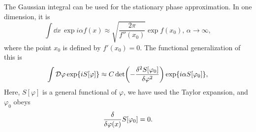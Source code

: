 The Gaussian integral can be used for the stationary phase approximation.
In one dimension, it is
\begin{equation}
    \int \dd x \, \exp{i \alpha f(x)} 
    \approx \sqrt{\frac{2 \pi }{f''(x_0)}}\exp{ f(x_0)}, 
    \, \alpha\rightarrow \infty,
\end{equation}
where the point $x_0$ is defined by $ f'(x_0) = 0$. 
The functional generalization of this is
\begin{equation}
    \int \mathcal{D} \varphi \exp{i S[\varphi]}
    \approx 
    C \det(- \frac{\delta^2 S[\varphi_0]}{\delta \varphi^2})
    \exp{i \alpha S[\varphi_0]  },
\end{equation}
Here, $S[\varphi]$ is a general functional of $\varphi$, we have used the Taylor expansion, and $\varphi_0$ obeys
\begin{equation}
    \frac{\delta }{\delta \varphi(x)}{S[\varphi_0]} = 0.
\end{equation}

